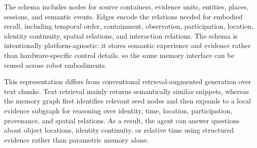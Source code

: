 



The schema includes nodes for source containers, evidence units, entities, places, sessions, and semantic events.
Edges encode the relations needed for embodied recall, including temporal order, containment, observation, participation, location, identity continuity, spatial relations, and interaction relations.
The schema is intentionally platform-agnostic: it stores semantic experience and evidence rather than hardware-specific control details, so the same memory interface can be reused across robot embodiments.

This representation differs from conventional retrieval-augmented generation over text chunks.
Text retrieval mainly returns semantically similar snippets, whereas the memory graph first identifies relevant seed nodes and then expands to a local evidence subgraph for reasoning over identity, time, location, participation, provenance, and spatial relations.
As a result, the agent can answer questions about object locations, identity continuity, or relative time using structured evidence rather than parametric memory alone.

